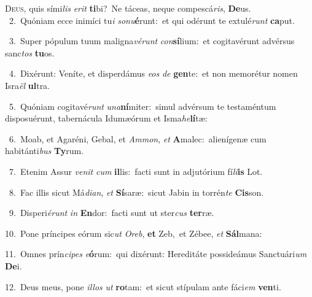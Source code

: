 \lettrine{\initial\textcolor{\initialcolor}{D}}{eus,} quis sími\textit{lis} \textit{e}\-\textit{rit} \textbf{ti}\-bi?~\star Ne táceas, neque compescá\-\textit{ris}\-, \textbf{De}\-us.\\
{\numbfont\textcolor{\numbcolor}{~2.}}~Quóniam ecce inimíci tu\textit{i} \textit{so}\-\textit{nu}\textbf{é}runt:~\star et qui odérunt te extulé\textit{runt} \textbf{ca}\-put.\par
{\numbfont\textcolor{\numbcolor}{~3.}}~Super pópulum tuum maligna\-\textit{vé}\-\textit{runt} \textit{con}\-\textbf{sí}lium:~\star et cogitavérunt advérsus sanc\textit{tos} \textbf{tu}\-os.\par
{\numbfont\textcolor{\numbcolor}{~4.}}~Dixérunt: Veníte, et disperdámus \textit{e}\-\textit{os} \textit{de} \textbf{gen}\-te:~\star et non memorétur nomen Isra\textit{ël} \textbf{ul}\-tra.\par
{\numbfont\textcolor{\numbcolor}{~5.}}~Quóniam cogitavé\textit{runt} \textit{u}\-\textit{na}\textbf{ní}miter:~\star simul advérsum te testaméntum disposuérunt, tabernácula Idumæórum et Isma\-\textit{he}\-\textbf{lí}tæ:\par
{\numbfont\textcolor{\numbcolor}{~6.}}~Moab, et Agaréni, Gebal, et \textit{Am}\-\textit{mon}, \textit{et} \textbf{A}\-malec:~\star alienígenæ cum habitánti\textit{bus} \textbf{Ty}\-rum.\par
{\numbfont\textcolor{\numbcolor}{~7.}}~Etenim Assur \textit{ve}\-\textit{nit} \textit{cum} \textbf{il}\-lis:~\star facti sunt in adjutórium fí\-\textit{li}\-\textbf{is} Lot.\par
{\numbfont\textcolor{\numbcolor}{~8.}}~Fac illis sicut Má\-\textit{di}\-\textit{an}, \textit{et} \textbf{Sí}\-saræ:~\star sicut Jabin in torrén\textit{te} \textbf{Cis}\-son.\par
{\numbfont\textcolor{\numbcolor}{~9.}}~Disperi\-\textit{é}\-\textit{runt} \textit{in} \textbf{En}\-dor:~\star facti sunt ut ster\textit{cus} \textbf{ter}\-ræ.\par
{\numbfont\textcolor{\numbcolor}{10.}}~Pone príncipes eórum sic\textit{ut} \textit{O}\-\textit{reb}, \textbf{et} Zeb,~\star et Zébee, \textit{et} \textbf{Sál}\-mana:\par
{\numbfont\textcolor{\numbcolor}{11.}}~Omnes prín\-\textit{ci}\-\textit{pes} \textit{e}\-\textbf{ó}rum:~\star qui dixérunt: Hereditáte possideámus Sanctuári\textit{um} \textbf{De}\-i.\par
{\numbfont\textcolor{\numbcolor}{12.}}~Deus meus, pone \textit{il}\-\textit{los} \textit{ut} \textbf{ro}\-tam:~\star et sicut stípulam ante fáci\textit{em} \textbf{ven}\-ti.\par
